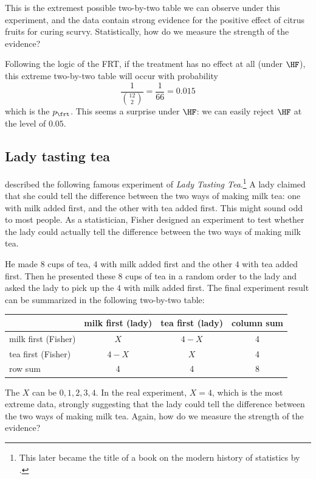 This is the extremest possible two-by-two table we can observe under this experiment, and the data contain strong evidence for the positive effect of citrus fruits for curing scurvy. Statistically, how do we measure the strength of the evidence?


Following the logic of the FRT, if the treatment has no effect at all (under $\HF$), this extreme two-by-two table will occur with probability 
$$
 \frac{1}{\binom{12}{2}} = \frac{1}{66} = 0.015
$$
which is the $p_\frt$. 
This seems a surprise under $\HF$: we can easily reject $\HF$ at the level of $0.05.$



\subsection{Lady tasting tea}\label{section::lady-tasting-tea}


\citet{Fisher:1935} described the following famous experiment of {\it Lady Tasting Tea}.\footnote{This later became the title of a book on the modern history of statistics by \citet{salsburg2001lady}.}  A lady claimed that she could tell the difference between the two ways of making milk tea: one with milk added first, and the other with tea added first. This might sound odd to most people. As a statistician, Fisher designed an experiment to test whether the lady could actually tell the difference between the two ways of making milk tea. 

He made $8$ cups of tea, $4$ with milk added first and the other $4$ with tea added first. Then he presented these $8$ cups of tea in a random order to the lady and asked the lady to pick up the $4$ with milk added first. The final experiment result can be summarized in the following two-by-two table: 

\begin{tabular}{lccc}
\hline 
      &    milk first (lady)&    tea first (lady) & column sum \\ \hline
      milk first (Fisher) & $X$ & $4-X$ & 4\\ 
   tea first (Fisher) & $4-X$ & $X$ & 4\\
   row sum & 4 & 4 &8 \\
   \hline 
\end{tabular}

The $X$ can be $0, 1, 2, 3, 4$. In the real experiment, $X = 4$, which is the most extreme data, strongly suggesting that the lady could tell the difference between the two ways of making milk tea. Again, how do we measure the strength of the evidence?


